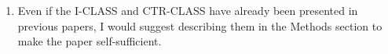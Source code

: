 \documentclass[12pt]{article}
\newcommand{\hlred}[1]{\sethlcolor{red!30}\hl{#1}}
\newenvironment{solved_reviewercomment}
    {\begin{tcolorbox}[width=\linewidth,colback=gray!5,colframe=solved_commentcolor!50,title=Reviewer Comment,left=5pt,right=5pt]}
    {\end{tcolorbox}}
\newenvironment{ourresponse}
    {\begin{tcolorbox}[width=\linewidth,breakable,enhanced,colback=gray!5,colframe=responsecolor!50,title=Response,left=5pt,right=5pt]}
    {\end{tcolorbox}}
\begin{document}
\begin{enumerate}[label=\arabic*.]
\begin{ourresponse}
\begin{quote}
\end{quote}
\end{ourresponse}


    
\item \leavevmode\vspace{-\baselineskip}
\begin{solved_reviewercomment}
Even if the I-CLASS and CTR-CLASS have already been presented in previous papers, I would suggest describing them in the Methods section to make the paper self-sufficient. 
\end{solved_reviewercomment}

\end{enumerate}
\end{document}
